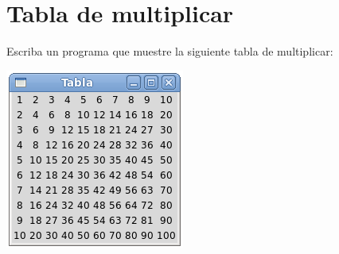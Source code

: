 \section{Tabla de multiplicar}

Escriba un programa que muestre la siguiente tabla de multiplicar:

\includegraphics{../../diapos/programas/tkinter/capturas/15.png}
